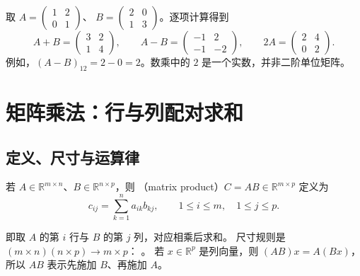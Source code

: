 \documentclass[UTF8,12pt,a4paper,fontset=fandol]{ctexart}
\begin{document}
\begin{example}[贯穿全文的一组矩阵]
\label{ex:matrix-operations-pair}
取 $A=\begin{pmatrix}1&2\\0&1\end{pmatrix}$、
$B=\begin{pmatrix}2&0\\1&3\end{pmatrix}$。逐项计算得到
\[
  A+B=\begin{pmatrix}3&2\\1&4\end{pmatrix},\qquad
  A-B=\begin{pmatrix}-1&2\\-1&-2\end{pmatrix},\qquad
  2A=\begin{pmatrix}2&4\\0&2\end{pmatrix}.
\]
例如，$(A-B)_{12}=2-0=2$。数乘中的 $2$ 是一个实数，并非二阶单位矩阵。
\end{example}

\section{矩阵乘法：行与列配对求和}

\subsection{定义、尺寸与运算律}

\begin{definition}[矩阵乘法]
若 $A\in\mathbb R^{m\times n}$、$B\in\mathbb R^{n\times p}$，则
（matrix product）$C=AB\in\mathbb R^{m\times p}$ 定义为
\begin{equation}
  c_{ij}=\sum_{k=1}^{n}a_{ik}b_{kj},\qquad
  1\le i\le m,\quad 1\le j\le p.
  \label{eq:matrix-product-entry}
\end{equation}
\end{definition}

即取 $A$ 的第 $i$ 行与 $B$ 的第 $j$ 列，对应相乘后求和。
尺寸规则是 $(m\times n)(n\times p)\longrightarrow m\times p$：
。
若 $x\in\mathbb R^p$ 是列向量，则 $(AB)x=A(Bx)$，所以 $AB$ 表示先施加 $B$、再施加 $A$。
\end{document}
